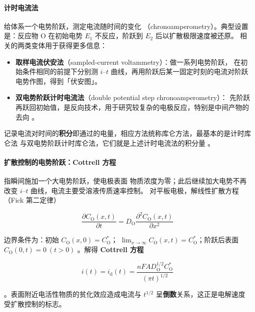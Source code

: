 \paragraph{计时电流法} 给体系一个电势阶跃，测定电流随时间的变化
（chronoamperometry）。典型设置是：反应物
$\mathrm{O}$ 在初始电势 $E_1$ 不反应，阶跃到 $E_2$ 后以扩散极限速度被还原。
相关的两类变体用于获得更多信息：

\begin{itemize}
\item \textbf{取样电流伏安法}（sampled-current voltammetry）：做一系列电势阶跃，
  在初始条件相同的前提下分别测 $i$--$t$ 曲线，再用阶跃后某一固定时刻的电流对阶跃
  电势作图，得到「伏安图」。
\item \textbf{双电势阶跃计时电流法}（double potential step chronoamperometry）：
  先阶跃再跃回初始值，是反向技术，用于研究较复杂的电极反应，特别是中间产物的去向
  。
\end{itemize}

记录电流对时间的\textbf{积分}即通过的电量，相应方法统称库仑方法，最基本的是计时库仑法
与双电势阶跃计时库仑法，它们就是上述计时电流法的积分量
。

\paragraph{扩散控制的电势阶跃：Cottrell 方程} 指瞬间施加一个大电势阶跃，使电极表面
物质浓度为零；此后继续加大电势不再改变 $i$--$t$ 曲线，电流主要受溶液传质速率控制。
对平板电极，解线性扩散方程（Fick 第二定律）

\begin{equation}
\frac{\partial C_{\mathrm{O}}(x,t)}{\partial t}
=D_{\mathrm{O}}\frac{\partial^2 C_{\mathrm{O}}(x,t)}{\partial x^2}
\label{eq:fick2}
\end{equation}

边界条件为：初始 $C_{\mathrm{O}}(x,0)=C_{\mathrm{O}}^*$；
$\lim_{x\to\infty}C_{\mathrm{O}}(x,t)=C_{\mathrm{O}}^*$；阶跃后表面
$C_{\mathrm{O}}(0,t)=0\ (t>0)$ 。解得
\textbf{Cottrell 方程}

\begin{equation}
i(t)=i_{\mathrm{d}}(t)=\frac{nFAD_{\mathrm{O}}^{1/2}C_{\mathrm{O}}^*}{(\pi t)^{1/2}}
\label{eq:cottrell}
\end{equation}

。表面附近电活性物质的贫化效应造成电流与
$t^{1/2}$ 呈\textbf{倒数}关系，这正是电解速度受扩散控制的标志。

